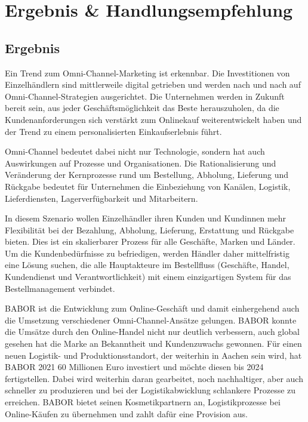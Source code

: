 \newpage
\section{Ergebnis \& Handlungsempfehlung}\label{hauptabschnitt_5}
\subsection{Ergebnis}\label{hauptabschnitt_5_1}
Ein Trend zum Omni-Channel-Marketing ist erkennbar. Die Investitionen von Einzelhändlern sind mittlerweile digital getrieben und werden nach und nach auf Omni-Channel-Strategien ausgerichtet. Die Unternehmen werden in Zukunft bereit sein, aus jeder Geschäftsmöglichkeit das Beste herauszuholen, da die Kundenanforderungen sich verstärkt zum Onlinekauf weiterentwickelt haben und der Trend zu einem personalisierten Einkaufserlebnis führt.
\newline

Omni-Channel bedeutet dabei nicht nur Technologie, sondern hat auch Auswirkungen auf Prozesse und Organisationen. Die Rationalisierung und Veränderung der Kernprozesse rund um Bestellung, Abholung, Lieferung und Rückgabe bedeutet für Unternehmen die Einbeziehung von Kanälen, Logistik, Lieferdiensten, Lagerverfügbarkeit und Mitarbeitern.
\newline

In diesem Szenario wollen Einzelhändler ihren Kunden und Kundinnen mehr Flexibilität bei der Bezahlung, Abholung, Lieferung, Erstattung und Rückgabe bieten. Dies ist ein skalierbarer Prozess für alle Geschäfte, Marken und Länder.
Um die Kundenbedürfnisse zu befriedigen, werden Händler daher mittelfristig eine Lösung suchen, die alle Hauptakteure im Bestellfluss (Geschäfte, Handel, Kundendienst und Verantwortlichkeit) mit einem einzigartigen System für das Bestellmanagement verbindet.


BABOR ist die Entwicklung zum Online-Geschäft und damit einhergehend auch die Umsetzung verschiedener Omni-Channel-Ansätze gelungen. BABOR konnte die Umsätze durch den Online-Handel nicht nur deutlich verbessern, auch global gesehen hat die Marke an Bekanntheit und Kundenzuwachs gewonnen. Für einen neuen Logistik- und Produktionsstandort, der weiterhin in Aachen sein wird, hat BABOR 2021 60 Millionen Euro investiert und möchte diesen bis 2024 fertigstellen. Dabei wird weiterhin daran gearbeitet, noch nachhaltiger, aber auch schneller zu produzieren und bei der Logistikabwicklung schlankere Prozesse zu erreichen. BABOR bietet seinen Kosmetikpartnern an, Logistikprozesse bei Online-Käufen zu übernehmen und zahlt dafür eine Provision aus.
\newline

